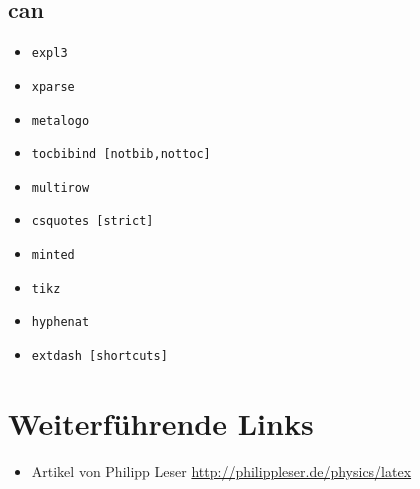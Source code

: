 \subsection{can}
\begin{itemize}
  \item \texttt{expl3}
  \item \texttt{xparse}
  \item \texttt{metalogo}
  \item \texttt{tocbibind [notbib,nottoc]}
  \item \texttt{multirow}
  \item \texttt{csquotes [strict]}
  \item \texttt{minted}
  \item \texttt{tikz}
  \item \texttt{hyphenat}
  \item \texttt{extdash [shortcuts]}
\end{itemize}

\section{Weiterführende Links}
\begin{itemize}
  \item Artikel von Philipp Leser \url{http://philippleser.de/physics/latex}
\end{itemize}
